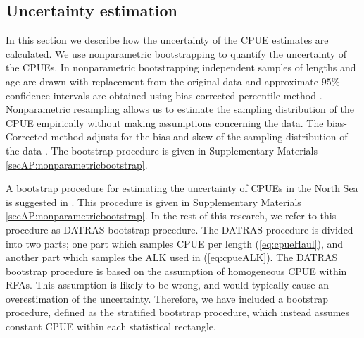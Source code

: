 \documentclass[a4paper 12pt]{article}
\numberwithin{equation}{section}
\begin{document}
\subsection{Uncertainty estimation}
\label{sec:uncertaintyestimation}
In this section we describe how the uncertainty of the CPUE estimates are calculated. We use nonparametric bootstrapping to quantify the uncertainty of the CPUEs. In nonparametric bootstrapping independent samples of lengths and age are drawn with replacement from the original data and approximate $95\%$ confidence intervals are obtained using bias-corrected percentile method  \citep{carpenter2000bootstrap}. Nonparametric resampling allows us to estimate the sampling distribution of the CPUE empirically without making assumptions concerning the data. The bias-Corrected method adjusts for the bias and skew of the sampling distribution of the data \citep{puth2015variety, karlsson2009bootstrap}. The bootstrap procedure is given in Supplementary Materials \ref{secAP:nonparametricbootstrap}.  

A bootstrap procedure for estimating the uncertainty of CPUEs in the North Sea is suggested in \citet{ICES2013}. This procedure is given in Supplementary Materials \ref{secAP:nonparametricbootstrap}. In the rest of this research, we refer to this procedure as DATRAS bootstrap procedure. The DATRAS procedure is divided into two parts; one part which samples CPUE per length (\ref{eq:cpueHaul}), and another part which samples the ALK used in (\ref{eq:cpueALK}). The DATRAS bootstrap procedure is based on the assumption of homogeneous CPUE within RFAs. This assumption is likely to be wrong, and would typically cause an overestimation of the uncertainty.  Therefore, we have included a bootstrap procedure, defined as the stratified bootstrap procedure, which instead assumes constant CPUE within each statistical rectangle. 
\end{document}

